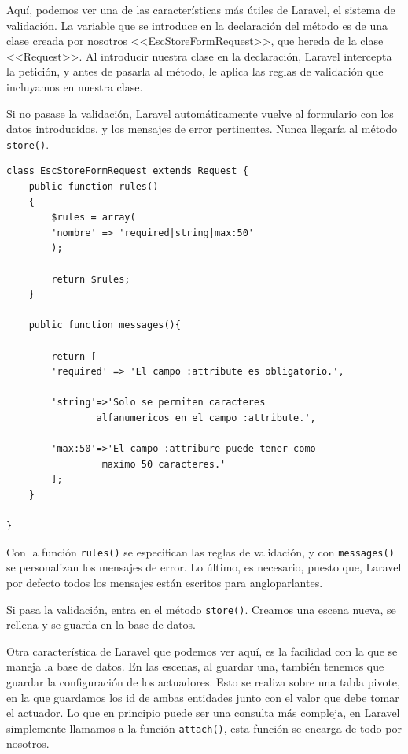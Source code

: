   Aquí, podemos ver una de las características más útiles de Laravel, el sistema de validación. La variable que se introduce en la declaración del método es de una clase creada por nosotros <<EscStoreFormRequest>>, que hereda de la clase <<Request>>. Al introducir nuestra clase en la declaración, Laravel intercepta la petición, y antes de pasarla al método, le aplica las reglas de validación que incluyamos en nuestra clase. 
   
   Si no pasase la validación, Laravel automáticamente vuelve al formulario con los datos introducidos, y los mensajes de error pertinentes. Nunca llegaría al método \lstinline|store()|.
   
   \begin{lstlisting}
class EscStoreFormRequest extends Request {
    public function rules()
    {
        $rules = array(
        'nombre' => 'required|string|max:50'
        );
    
        return $rules;
    }
    
    public function messages(){
    
        return [
        'required' => 'El campo :attribute es obligatorio.',
        
        'string'=>'Solo se permiten caracteres 
                alfanumericos en el campo :attribute.',
                
        'max:50'=>'El campo :attribure puede tener como
                 maximo 50 caracteres.'
        ];
    }

}
    \end{lstlisting}
   
   Con la función \lstinline|rules()| se especifican las reglas de validación, y con \lstinline|messages()| se personalizan los mensajes de error. Lo último, es necesario, puesto que, Laravel por defecto todos los mensajes están escritos para angloparlantes.
   
   Si pasa la validación, entra en el método \lstinline|store()|. Creamos una escena nueva, se rellena y se guarda en  la base de datos.
   
   Otra característica de Laravel que podemos ver aquí, es la facilidad con la que se maneja la base de datos. En las escenas, al guardar una, también tenemos que guardar la configuración de los actuadores. Esto se realiza sobre una tabla pivote, en la que guardamos los id de ambas entidades junto con el valor que debe tomar el actuador. Lo que en principio puede ser una consulta más compleja, en Laravel simplemente llamamos a la función \lstinline|attach()|, esta función se encarga de todo por nosotros.
   
